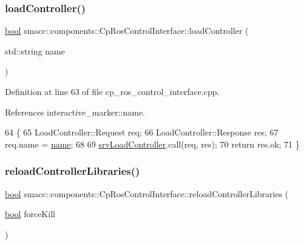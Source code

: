 \subsubsection{\texorpdfstring{load\+Controller()}{loadController()}}
{\footnotesize\ttfamily \hyperlink{classbool}{bool} smacc\+::components\+::\+Cp\+Ros\+Control\+Interface\+::load\+Controller (\begin{DoxyParamCaption}\item[{std\+::string}]{name }\end{DoxyParamCaption})}



Definition at line 63 of file cp\+\_\+ros\+\_\+control\+\_\+interface.\+cpp.



References interactive\+\_\+marker\+::name.


\begin{DoxyCode}
64 \{
65     LoadController::Request req;
66     LoadController::Response res;
67     req.name = \hyperlink{namespaceinteractive__marker_a447655961b3d3ca3c5a2a9d3d769436d}{name};
68 
69     \hyperlink{classsmacc_1_1components_1_1CpRosControlInterface_aa6c1440534d6a825644f0c3620461b72}{srvLoadController}.call(req, res);
70     \textcolor{keywordflow}{return} res.ok;
71 \}
\end{DoxyCode}
\mbox{\label{classsmacc_1_1components_1_1CpRosControlInterface_acd3534897ecf6b28ee3804dcbefedae9}} 
\subsubsection{\texorpdfstring{reload\+Controller\+Libraries()}{reloadControllerLibraries()}}
{\footnotesize\ttfamily \hyperlink{classbool}{bool} smacc\+::components\+::\+Cp\+Ros\+Control\+Interface\+::reload\+Controller\+Libraries (\begin{DoxyParamCaption}\item[{\hyperlink{classbool}{bool}}]{force\+Kill }\end{DoxyParamCaption})}



